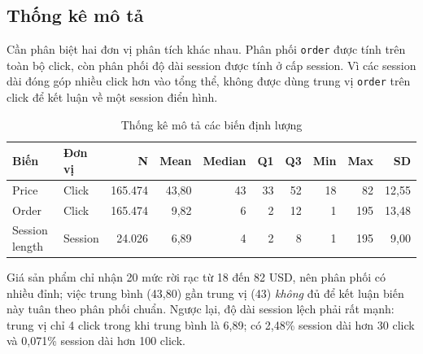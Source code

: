 \subsection{Thống kê mô tả}

Cần phân biệt hai đơn vị phân tích khác nhau. Phân phối \texttt{order} được tính
trên toàn bộ click, còn phân phối độ dài session được tính ở cấp session. Vì các
session dài đóng góp nhiều click hơn vào tổng thể, không được dùng trung vị
\texttt{order} trên click để kết luận về một session điển hình.

\begin{table}[H]
\centering
\caption{Thống kê mô tả các biến định lượng}
\label{tab:continuous}
\small
\begin{tabular}{llrrrrrrrr}
\toprule
\textbf{Biến} & \textbf{Đơn vị} & \textbf{N} & \textbf{Mean} & \textbf{Median}
& \textbf{Q1} & \textbf{Q3} & \textbf{Min} & \textbf{Max} & \textbf{SD} \\
\midrule
Price          & Click   & 165.474 & 43,80 & 43 & 33 & 52 & 18 & 82 & 12,55 \\
Order          & Click   & 165.474 & 9,82  & 6  & 2  & 12 & 1  & 195 & 13,48 \\
Session length & Session & 24.026  & 6,89  & 4  & 2  & 8  & 1  & 195 & 9,00 \\
\bottomrule
\end{tabular}
\end{table}

Giá sản phẩm chỉ nhận 20 mức rời rạc từ 18 đến 82 USD, nên phân phối có nhiều
đỉnh; việc trung bình (43,80) gần trung vị (43) \emph{không} đủ để kết luận biến
này tuân theo phân phối chuẩn. Ngược lại, độ dài session lệch phải rất mạnh:
trung vị chỉ 4 click trong khi trung bình là 6,89; có 2,48\% session dài hơn 30
click và 0,071\% session dài hơn 100 click.

